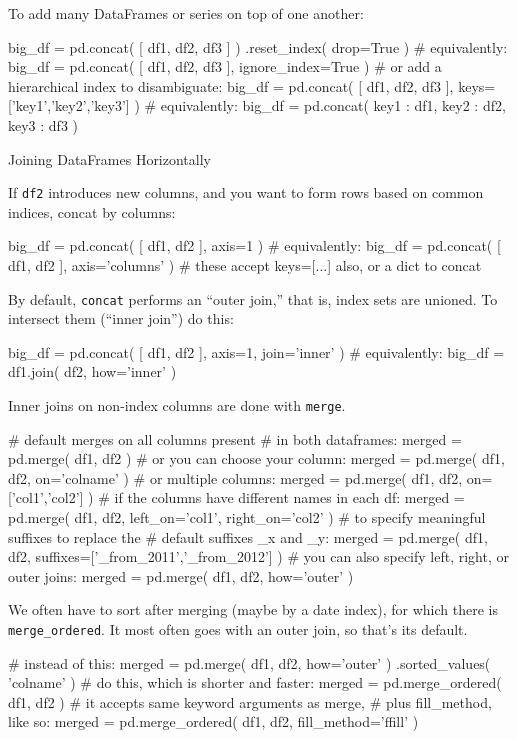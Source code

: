 \documentclass[a4paper,landscape,columns=3]{cheatsheet}
\def\sect#1{\begin{tcolorbox}[colback=blue!5!white,colframe=blue!75!black,size=title,leftrule=2mm]
    \large #1
\end{tcolorbox}}
\begin{document}
To add many DataFrames or series on top of one another:
\begin{python}
big_df = pd.concat( [ df1, df2, df3 ] )
           .reset_index( drop=True )
# equivalently:
big_df = pd.concat( [ df1, df2, df3 ],
                    ignore_index=True )
# or add a hierarchical index to disambiguate:
big_df = pd.concat( [ df1, df2, df3 ],
                    keys=['key1','key2','key3'] )
# equivalently:
big_df = pd.concat( { key1 : df1,
                      key2 : df2,
                      key3 : df3 } )
\end{python}

\sect{Joining DataFrames Horizontally}

If \lstinline{df2} introduces new columns, and you want to form rows based on common indices, concat by columns:
\begin{python}
big_df = pd.concat( [ df1, df2 ], axis=1 )
# equivalently:
big_df = pd.concat( [ df1, df2 ], axis='columns' )
# these accept keys=[...] also, or a dict to concat
\end{python}

By default, \lstinline{concat} performs an ``outer join,'' that is, index sets are unioned.  To intersect them (``inner join'') do this:
\begin{python}
big_df = pd.concat( [ df1, df2 ], axis=1,
                    join='inner' )
# equivalently:
big_df = df1.join( df2, how='inner' )
\end{python}

Inner joins on non-index columns are done with \lstinline{merge}.
\begin{python}
# default merges on all columns present
# in both dataframes:
merged = pd.merge( df1, df2 )
# or you can choose your column:
merged = pd.merge( df1, df2, on='colname' )
# or multiple columns:
merged = pd.merge( df1, df2, on=['col1','col2'] )
# if the columns have different names in each df:
merged = pd.merge( df1, df2,
    left_on='col1', right_on='col2' )
# to specify meaningful suffixes to replace the
# default suffixes _x and _y:
merged = pd.merge( df1, df2,
    suffixes=['_from_2011','_from_2012'] )
# you can also specify left, right, or outer joins:
merged = pd.merge( df1, df2, how='outer' )
\end{python}

We often have to sort after merging (maybe by a date index), for which there is \lstinline{merge_ordered}.  It most often goes with an outer join, so that's its default.
\begin{python}
# instead of this:
merged = pd.merge( df1, df2, how='outer' )
           .sorted_values( 'colname' )
# do this, which is shorter and faster:
merged = pd.merge_ordered( df1, df2 )
# it accepts same keyword arguments as merge,
# plus fill_method, like so:
merged = pd.merge_ordered( df1, df2,
           fill_method='ffill' )
\end{python}
\end{document}
